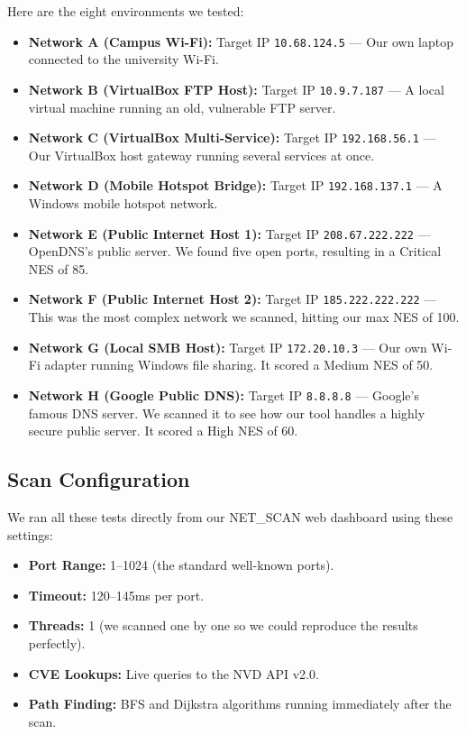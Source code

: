 \documentclass[conference]{IEEEtran}
\begin{document}
Here are the eight environments we tested:
\begin{itemize}
    \item \textbf{Network A (Campus Wi-Fi):} Target IP \texttt{10.68.124.5} --- Our own laptop connected to the university Wi-Fi.
    \item \textbf{Network B (VirtualBox FTP Host):} Target IP \texttt{10.9.7.187} --- A local virtual machine running an old, vulnerable FTP server.
    \item \textbf{Network C (VirtualBox Multi-Service):} Target IP \texttt{192.168.56.1} --- Our VirtualBox host gateway running several services at once.
    \item \textbf{Network D (Mobile Hotspot Bridge):} Target IP \texttt{192.168.137.1} --- A Windows mobile hotspot network.
    \item \textbf{Network E (Public Internet Host 1):} Target IP \texttt{208.67.222.222} --- OpenDNS's public server. We found five open ports, resulting in a Critical NES of 85.
    \item \textbf{Network F (Public Internet Host 2):} Target IP \texttt{185.222.222.222} --- This was the most complex network we scanned, hitting our max NES of 100.
    \item \textbf{Network G (Local SMB Host):} Target IP \texttt{172.20.10.3} --- Our own Wi-Fi adapter running Windows file sharing. It scored a Medium NES of 50.
    \item \textbf{Network H (Google Public DNS):} Target IP \texttt{8.8.8.8} --- Google's famous DNS server. We scanned it to see how our tool handles a highly secure public server. It scored a High NES of 60.
\end{itemize}

\subsection{Scan Configuration}
We ran all these tests directly from our NET\_SCAN web dashboard using these settings:
\begin{itemize}
    \item \textbf{Port Range:} 1--1024 (the standard well-known ports).
    \item \textbf{Timeout:} 120--145ms per port.
    \item \textbf{Threads:} 1 (we scanned one by one so we could reproduce the results perfectly).
    \item \textbf{CVE Lookups:} Live queries to the NVD API v2.0.
    \item \textbf{Path Finding:} BFS and Dijkstra algorithms running immediately after the scan.
\end{itemize}
\end{document}
